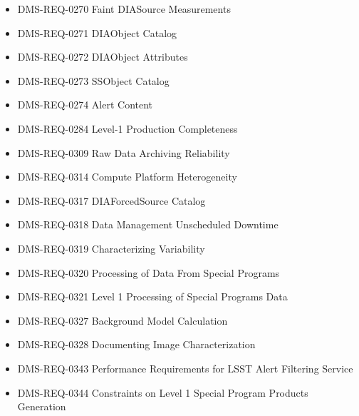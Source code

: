 \begin{itemize}
\item DMS-REQ-0270 Faint DIASource Measurements
\item DMS-REQ-0271 DIAObject Catalog
\item DMS-REQ-0272 DIAObject Attributes
\item DMS-REQ-0273 SSObject Catalog
\item DMS-REQ-0274 Alert Content
\item DMS-REQ-0284 Level-1 Production Completeness
\item DMS-REQ-0309 Raw Data Archiving Reliability
\item DMS-REQ-0314 Compute Platform Heterogeneity
\item DMS-REQ-0317 DIAForcedSource Catalog
\item DMS-REQ-0318 Data Management Unscheduled Downtime
\item DMS-REQ-0319 Characterizing Variability
\item DMS-REQ-0320 Processing of Data From Special Programs
\item DMS-REQ-0321 Level 1 Processing of Special Programs Data
\item DMS-REQ-0327 Background Model Calculation
\item DMS-REQ-0328 Documenting Image Characterization
\item DMS-REQ-0343 Performance Requirements for LSST Alert Filtering Service
\item DMS-REQ-0344 Constraints on Level 1 Special Program Products Generation
\end{itemize}
